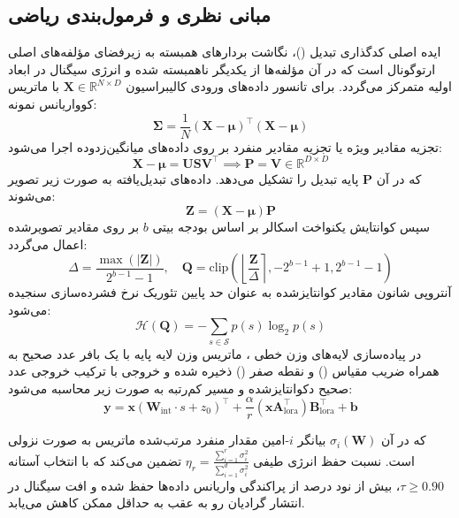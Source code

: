 \subsection{مبانی نظری و فرمول‌بندی ریاضی}
ایده اصلی کدگذاری تبدیل ()، نگاشت بردارهای همبسته به زیرفضای مؤلفه‌های اصلی ارتوگونال است که در آن مؤلفه‌ها از یکدیگر ناهمبسته شده و انرژی سیگنال در ابعاد اولیه متمرکز می‌گردد. برای تانسور داده‌های ورودی کالیبراسیون $\mathbf{X} \in \mathbb{R}^{N \times D}$ با ماتریس کوواریانس نمونه:
\begin{equation}
\mathbf{\Sigma} = \frac{1}{N} (\mathbf{X} - \mathbf{\mu})^\top (\mathbf{X} - \mathbf{\mu})
\end{equation}
تجزیه مقادیر ویژه یا تجزیه مقادیر منفرد بر روی داده‌های میانگین‌زدوده اجرا می‌شود:
\begin{equation}
\mathbf{X} - \mathbf{\mu} = \mathbf{U} \mathbf{S} \mathbf{V}^\top \implies \mathbf{P} = \mathbf{V} \in \mathbb{R}^{D \times D}
\end{equation}
که در آن $\mathbf{P}$ پایه تبدیل  را تشکیل می‌دهد. داده‌های تبدیل‌یافته به صورت زیر تصویر می‌شوند:
\begin{equation}
\mathbf{Z} = (\mathbf{X} - \mathbf{\mu}) \mathbf{P}
\end{equation}
سپس کوانتایش یکنواخت اسکالر بر اساس بودجه بیتی $b$ بر روی مقادیر تصویرشده اعمال می‌گردد:
\begin{equation}
\Delta = \frac{\max(|\mathbf{Z}|)}{2^{b-1} - 1}, \quad \mathbf{Q} = \text{clip}\left( \left\lfloor \frac{\mathbf{Z}}{\Delta} \right\rceil, -2^{b-1}+1, 2^{b-1}-1 \right)
\end{equation}
آنتروپی شانون مقادیر کوانتایزشده به عنوان حد پایین تئوریک نرخ فشرده‌سازی سنجیده می‌شود:
\begin{equation}
\mathcal{H}(\mathbf{Q}) = -\sum_{s \in \mathcal{S}} p(s) \log_2 p(s)
\end{equation}
در پیاده‌سازی لایه‌های وزن خطی ، ماتریس وزن لایه پایه با یک بافر عدد صحیح به همراه ضریب مقیاس () و نقطه صفر () ذخیره شده و خروجی با ترکیب خروجی عدد صحیح دکوانتایزشده و مسیر کم‌رتبه به صورت زیر محاسبه می‌شود:
\begin{equation}
\mathbf{y} = \mathbf{x} \left( \mathbf{W}_{\text{int}} \cdot s + z_0 \right)^\top + \frac{\alpha}{r} (\mathbf{x} \mathbf{A}_{\text{lora}}^\top) \mathbf{B}_{\text{lora}}^\top + \mathbf{b}
\end{equation}

که در آن $\sigma_i(\mathbf{W})$ بیانگر $i$-امین مقدار منفرد مرتب‌شده ماتریس به صورت نزولی است. نسبت حفظ انرژی طیفی $\eta_r = \frac{\sum_{i=1}^r \sigma_i^2}{\sum_{i=1}^{d} \sigma_i^2}$ تضمین می‌کند که با انتخاب آستانه $\tau \ge 0.90$، بیش از نود درصد از پراکندگی واریانس داده‌ها حفظ شده و افت سیگنال در انتشار گرادیان رو به عقب به حداقل ممکن کاهش می‌یابد.

